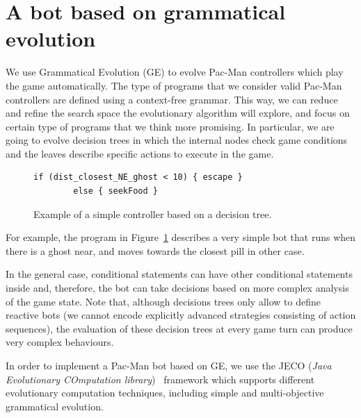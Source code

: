 \documentclass{llncs}
\newcommand{\paco}{Pac-Man }
\begin{document}
%
\section{A bot based on grammatical evolution}
\label{sec:sec1}
%

We use Grammatical Evolution (GE) to evolve \paco controllers which play the game automatically. The type of programs that we consider valid \paco controllers are defined using a context-free grammar. This way, we can reduce and refine the search space the evolutionary algorithm will explore, and focus on certain type of programs that we think more promising. In particular, we are going to evolve decision trees in which the internal nodes check game conditions and the leaves describe specific actions to execute in the game.

\begin{figure}[tb]
	\centering
\begin{lstlisting}[frame=single, breaklines=no, basicstyle=\fontsize{10}{11}\ttfamily]
        if (dist_closest_NE_ghost < 10) { escape } 
        else { seekFood }
\end{lstlisting} %
	\caption{Example of a simple controller based on a decision tree.}
	\label{fig:example}
\end{figure}

For example, the program in Figure~\ref{fig:example} describes a very simple bot that runs when there is a ghost near, and moves towards the closest pill in other case. 

In the general case, conditional statements can have other conditional statements inside and, therefore, the bot can take decisions based on more complex analysis of the game state. Note that, although decisions trees only allow to define reactive bots (we cannot encode explicitly advanced strategies consisting of action sequences), the evaluation of these decision trees at every game turn can produce very complex behaviours. 

In order to implement a \paco bot based on GE, we use the JECO (\textit{Java Evolutionary COmputation library})~\cite{jecorepo} framework which supports different evolutionary computation techniques, including simple and multi-objective grammatical evolution.
\end{document}
